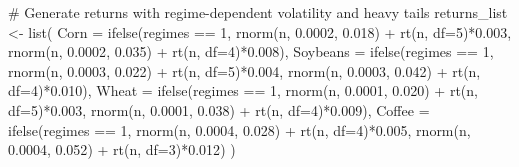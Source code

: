 \documentclass[
  10pt,
  a4paper,
]{article}
\newenvironment{Shaded}{\begin{snugshade}}{\end{snugshade}}
\newcommand{\AttributeTok}[1]{\textcolor[rgb]{0.40,0.45,0.13}{#1}}
\newcommand{\CommentTok}[1]{\textcolor[rgb]{0.37,0.37,0.37}{#1}}
\newcommand{\DecValTok}[1]{\textcolor[rgb]{0.68,0.00,0.00}{#1}}
\newcommand{\FloatTok}[1]{\textcolor[rgb]{0.68,0.00,0.00}{#1}}
\newcommand{\FunctionTok}[1]{\textcolor[rgb]{0.28,0.35,0.67}{#1}}
\newcommand{\NormalTok}[1]{\textcolor[rgb]{0.00,0.23,0.31}{#1}}
\newcommand{\OtherTok}[1]{\textcolor[rgb]{0.00,0.23,0.31}{#1}}
\newcommand{\SpecialCharTok}[1]{\textcolor[rgb]{0.37,0.37,0.37}{#1}}
\begin{document}
\begin{Shaded}
\begin{Highlighting}[]
\CommentTok{\# Generate returns with regime{-}dependent volatility and heavy tails}
\NormalTok{returns\_list }\OtherTok{\textless{}{-}} \FunctionTok{list}\NormalTok{(}
  \AttributeTok{Corn =} \FunctionTok{ifelse}\NormalTok{(regimes }\SpecialCharTok{==} \DecValTok{1}\NormalTok{, }
                \FunctionTok{rnorm}\NormalTok{(n, }\FloatTok{0.0002}\NormalTok{, }\FloatTok{0.018}\NormalTok{) }\SpecialCharTok{+} \FunctionTok{rt}\NormalTok{(n, }\AttributeTok{df=}\DecValTok{5}\NormalTok{)}\SpecialCharTok{*}\FloatTok{0.003}\NormalTok{,}
                \FunctionTok{rnorm}\NormalTok{(n, }\FloatTok{0.0002}\NormalTok{, }\FloatTok{0.035}\NormalTok{) }\SpecialCharTok{+} \FunctionTok{rt}\NormalTok{(n, }\AttributeTok{df=}\DecValTok{4}\NormalTok{)}\SpecialCharTok{*}\FloatTok{0.008}\NormalTok{),}
  \AttributeTok{Soybeans =} \FunctionTok{ifelse}\NormalTok{(regimes }\SpecialCharTok{==} \DecValTok{1}\NormalTok{,}
                    \FunctionTok{rnorm}\NormalTok{(n, }\FloatTok{0.0003}\NormalTok{, }\FloatTok{0.022}\NormalTok{) }\SpecialCharTok{+} \FunctionTok{rt}\NormalTok{(n, }\AttributeTok{df=}\DecValTok{5}\NormalTok{)}\SpecialCharTok{*}\FloatTok{0.004}\NormalTok{,}
                    \FunctionTok{rnorm}\NormalTok{(n, }\FloatTok{0.0003}\NormalTok{, }\FloatTok{0.042}\NormalTok{) }\SpecialCharTok{+} \FunctionTok{rt}\NormalTok{(n, }\AttributeTok{df=}\DecValTok{4}\NormalTok{)}\SpecialCharTok{*}\FloatTok{0.010}\NormalTok{),}
  \AttributeTok{Wheat =} \FunctionTok{ifelse}\NormalTok{(regimes }\SpecialCharTok{==} \DecValTok{1}\NormalTok{,}
                 \FunctionTok{rnorm}\NormalTok{(n, }\FloatTok{0.0001}\NormalTok{, }\FloatTok{0.020}\NormalTok{) }\SpecialCharTok{+} \FunctionTok{rt}\NormalTok{(n, }\AttributeTok{df=}\DecValTok{5}\NormalTok{)}\SpecialCharTok{*}\FloatTok{0.003}\NormalTok{,}
                 \FunctionTok{rnorm}\NormalTok{(n, }\FloatTok{0.0001}\NormalTok{, }\FloatTok{0.038}\NormalTok{) }\SpecialCharTok{+} \FunctionTok{rt}\NormalTok{(n, }\AttributeTok{df=}\DecValTok{4}\NormalTok{)}\SpecialCharTok{*}\FloatTok{0.009}\NormalTok{),}
  \AttributeTok{Coffee =} \FunctionTok{ifelse}\NormalTok{(regimes }\SpecialCharTok{==} \DecValTok{1}\NormalTok{,}
                  \FunctionTok{rnorm}\NormalTok{(n, }\FloatTok{0.0004}\NormalTok{, }\FloatTok{0.028}\NormalTok{) }\SpecialCharTok{+} \FunctionTok{rt}\NormalTok{(n, }\AttributeTok{df=}\DecValTok{4}\NormalTok{)}\SpecialCharTok{*}\FloatTok{0.005}\NormalTok{,}
                  \FunctionTok{rnorm}\NormalTok{(n, }\FloatTok{0.0004}\NormalTok{, }\FloatTok{0.052}\NormalTok{) }\SpecialCharTok{+} \FunctionTok{rt}\NormalTok{(n, }\AttributeTok{df=}\DecValTok{3}\NormalTok{)}\SpecialCharTok{*}\FloatTok{0.012}\NormalTok{)}
\NormalTok{)}


\end{Highlighting}
\end{Shaded}
\end{document}
